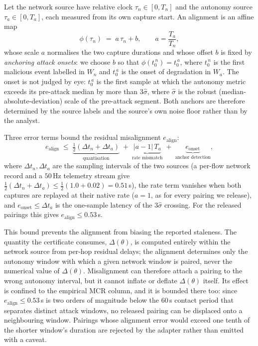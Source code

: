 Let the network source have relative clock $\tau_n\in[0,T_n]$ and the autonomy
source $\tau_a\in[0,T_a]$, each measured from its own capture start. An
alignment is an affine map
\begin{equation}
\label{eq:align}
\phi(\tau_n) \;=\; a\,\tau_n + b, \qquad a=\frac{T_a}{T_n},
\end{equation}
whose scale $a$ normalises the two capture durations and whose offset $b$ is
fixed by \emph{anchoring attack onsets}: we choose $b$ so that
$\phi(t_0^{\,n}) = t_0^{\,a}$, where $t_0^{\,n}$ is the first malicious event
labelled in $W_n$ and $t_0^{\,a}$ is the onset of degradation in $W_a$. The
onset is not judged by eye: $t_0^{\,a}$ is the first sample at which the
autonomy metric exceeds its pre-attack median by more than $3\hat\sigma$, where
$\hat\sigma$ is the robust (median-absolute-deviation) scale of the pre-attack
segment. Both anchors are therefore determined by the source labels and the
source's own noise floor rather than by the analyst.

Three error terms bound the residual misalignment $e_{\mathrm{align}}$:
\begin{equation}
\label{eq:align_err}
e_{\mathrm{align}} \;\le\; \underbrace{\tfrac{1}{2}(\Delta t_n+\Delta t_a)}_{\text{quantisation}}
\;+\;\underbrace{|a-1|\,T_a}_{\text{rate mismatch}}
\;+\;\underbrace{e_{\mathrm{onset}}}_{\text{anchor detection}},
\end{equation}
where $\Delta t_n,\Delta t_a$ are the sampling intervals of the two sources (a
per-flow network record and a $50$\,Hz telemetry stream give
$\tfrac12(\Delta t_n+\Delta t_a)\le\tfrac12(1.0+0.02)=0.51$\,s), the rate term
vanishes when both captures are replayed at their native rate ($a=1$, as for
every pairing we release), and $e_{\mathrm{onset}}\le\Delta t_a$ is the
one-sample latency of the $3\hat\sigma$ crossing. For the released
 pairings this gives
$e_{\mathrm{align}}\le0.53$\,s.

This bound prevents the alignment from biasing the reported staleness. The
quantity the certificate consumes, $\Delta(\theta)$, is computed entirely within
the network source from per-hop residual delays; the alignment determines only
the autonomy window with which a given network window is paired, never the
numerical value of $\Delta(\theta)$. Misalignment can therefore attach a pairing
to the wrong autonomy interval, but it cannot inflate or deflate $\Delta(\theta)$
itself. Its effect is confined to the empirical MCR column, and it is bounded
there too: since $e_{\mathrm{align}}\le0.53$\,s is two orders of magnitude
below the $60$\,s contact period that separates distinct attack windows, no
released pairing can be displaced onto a neighbouring window. Pairings whose
alignment error would exceed one tenth of the shorter window's duration are
rejected by the adapter rather than emitted with a caveat.

